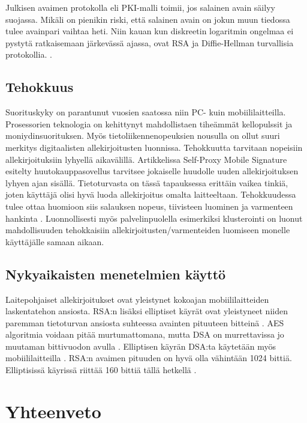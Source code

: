 \documentclass[finnish]{tktltiki2}
\theoremstyle{definition}
\theoremstyle{remark}
\begin{document}
Julkisen avaimen protokolla eli PKI-malli toimii, jos salainen avain säilyy suojassa. Mikäli on pienikin riski, että salainen avain on jokun muun tiedossa tulee avainpari vaihtaa heti. Niin kauan kun diskreetin logaritmin ongelmaa ei pystytä ratkaisemaan järkevässä ajassa, ovat RSA ja Diffie-Hellman turvallisia protokollia. \cite{enti}.
	  

\subsection{Tehokkuus}

Suorituskyky on parantunut vuosien saatossa niin PC- kuin mobiililaitteilla. Prosessorien teknologia on kehittynyt mahdollistaen tiheämmät kellopulssit ja moniydinsuorituksen. Myös tietoliikennenopeuksien nousulla on ollut suuri merkitys digitaalisten allekirjoitusten luonnissa. Tehokkuutta tarvitaan nopeisiin allekirjoituksiin lyhyellä aikavälillä. Artikkelissa Self-Proxy Mobile Signature esitelty huutokauppasovellus tarvitsee jokaiselle huudolle uuden  allekirjoituksen lyhyen ajan sisällä. Tietoturvasta on tässä tapauksessa erittäin vaikea tinkiä, joten käyttäjä olisi hyvä luoda allekirjoitus omalta laitteeltaan. Tehokkuudessa tulee ottaa huomioon siis salauksen nopeus, tiivisteen luominen ja varmenteen hankinta \cite{proxy}. Luonnollisesti myös palvelinpuolella esimerkiksi klusterointi on luonut mahdollisuuden tehokkaisiin allekirjoitusten/varmenteiden luomiseen monelle käyttäjälle samaan aikaan.

\subsection{Nykyaikaisten menetelmien käyttö}

Laitepohjaiset allekirjoitukset ovat yleistynet kokoajan mobiililaitteiden laskentatehon ansiosta. RSA:n lisäksi elliptiset käyrät ovat yleistyneet niiden paremman tietoturvan ansiosta suhteessa avainten pituuteen bitteinä \cite{ECC}. AES algoritmia voidaan pitää murtumattomana, mutta DSA on murrettavissa jo muutaman bittivuodon avulla \cite{gsm}. Elliptisen käyrän DSA:ta käytetään myös mobiililaitteilla \cite{webs}. RSA:n avaimen pituuden on hyvä olla vähintään 1024 bittiä. Elliptisissä käyrissä riittää 160 bittiä tällä hetkellä \cite{ECC}.   

\section{Yhteenveto}  
\end{document}
